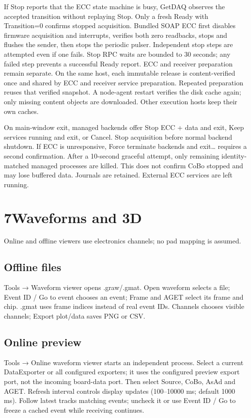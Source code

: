 \documentclass[11pt,a4paper]{article}
\newcommand{\note}[1]{\begin{tcolorbox}[colback=light,colframe=accent!40,boxrule=0.5pt,arc=2mm,left=8pt,right=8pt,top=5pt,bottom=5pt]#1\end{tcolorbox}}
\newcommand{\pagehead}[2]{\pdfbookmark[1]{#1}{getdaq-guide-\thepage}\section*{#1}\textcolor{muted}{#2}\par\vspace{3pt}}
\begin{document}
\note{If Stop reports that the ECC state machine is busy, GetDAQ observes the accepted transition without replaying Stop. Only a fresh Ready with Transition=0 confirms stopped acquisition. Bundled SOAP ECC first disables firmware acquisition and interrupts, verifies both zero readbacks, stops and flushes the sender, then stops the periodic pulser. Independent stop steps are attempted even if one fails. Stop RPC waits are bounded to 30 seconds; any failed step prevents a successful Ready report. ECC and receiver preparation remain separate. On the same host, each immutable release is content-verified once and shared by ECC and receiver service preparation. Repeated preparation reuses that verified snapshot. A node-agent restart verifies the disk cache again; only missing content objects are downloaded. Other execution hosts keep their own caches.}

\note{On main-window exit, managed backends offer Stop ECC + data and exit, Keep services running and exit, or Cancel. Stop acquisition before normal backend shutdown. If ECC is unresponsive, Force terminate backends and exit… requires a second confirmation. After a 10-second graceful attempt, only remaining identity-matched managed processes are killed. This does not confirm CoBo stopped and may lose buffered data. Journals are retained. External ECC services are left running.}

\newpage
\pagehead{7\quad Waveforms and 3D}{Online and offline viewers use electronics channels; no pad mapping is assumed.}
\subsection*{Offline files}
Tools → Waveform viewer opens .graw/.gmat. Open waveform selects a file; Event ID / Go to event chooses an event; Frame and AGET select its frame and chip. .gmat uses frame indices instead of real event IDs. Channels chooses visible channels; Export plot/data saves PNG or CSV.

\subsection*{Online preview}
Tools → Online waveform viewer starts an independent process. Select a current DataExporter or all configured exporters; it uses the configured preview export port, not the incoming board-data port. Then select Source, CoBo, AsAd and AGET. Refresh interval controls display updates (100–10000 ms; default 1000 ms). Follow latest tracks matching events; uncheck it or use Event ID / Go to freeze a cached event while receiving continues.
\end{document}
